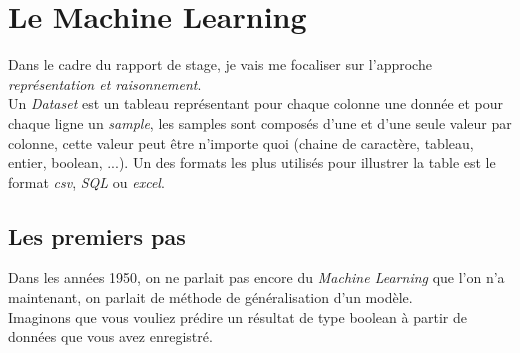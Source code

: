 \chapter{Le Machine Learning}

Dans le cadre du rapport de stage, je vais me focaliser sur l'approche \textit{représentation et raisonnement}.\\
\linebreak
Un \textit{Dataset} est un tableau représentant pour chaque colonne une donnée et pour chaque ligne un \textit{sample}, les samples sont composés d'une et d'une seule valeur par colonne, cette valeur peut être n'importe quoi (chaine de caractère, tableau, entier, boolean, ...). Un des formats les plus utilisés pour illustrer la table est le format \textit{csv}, \textit{SQL} ou \textit{excel}.\\
\pagebreak

\section{Les premiers pas}

Dans les années 1950, on ne parlait pas encore du \textit{Machine Learning} que l'on n'a maintenant, on parlait de méthode de généralisation d'un modèle.\\
Imaginons que vous vouliez prédire un résultat de type boolean à partir de données que vous avez enregistré.

